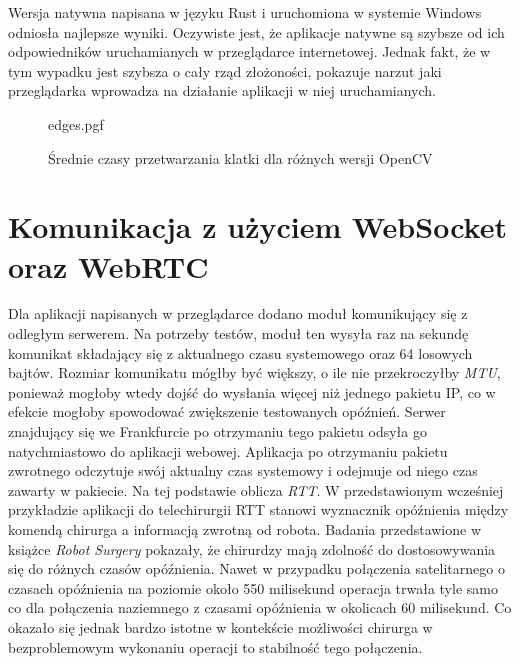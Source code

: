 \documentclass[language=polish,type=master]{aghmodern}
\begin{document}
Wersja natywna napisana w języku Rust i uruchomiona w systemie Windows odniosła najlepsze wyniki.
Oczywiste jest, że aplikacje natywne są szybsze od ich odpowiedników uruchamianych w przeglądarce internetowej.
Jednak fakt, że w tym wypadku jest szybsza o cały rząd złożoności, pokazuje narzut jaki przeglądarka wprowadza na działanie aplikacji w niej uruchamianych.

\begin{figure}[H]
    \centering
    {edges.pgf}
    \caption{Średnie czasy przetwarzania klatki dla różnych wersji OpenCV}
    \label{fig:edges}
\end{figure}

\section{Komunikacja z użyciem WebSocket oraz WebRTC}
Dla aplikacji napisanych w przeglądarce dodano moduł komunikujący się z odległym serwerem.
Na potrzeby testów, moduł ten wysyła raz na sekundę komunikat składający się z aktualnego czasu systemowego oraz 64 losowych bajtów.
Rozmiar komunikatu mógłby być większy, o ile nie przekroczyłby \emph{MTU}\footnotemark{}, ponieważ mogłoby wtedy dojść do wysłania więcej niż jednego pakietu IP, co w efekcie mogłoby spowodować zwiększenie testowanych opóźnień.
Serwer znajdujący się we Frankfurcie po otrzymaniu tego pakietu odsyła go natychmiastowo do aplikacji webowej.
Aplikacja po otrzymaniu pakietu zwrotnego odczytuje swój aktualny czas systemowy i odejmuje od niego czas zawarty w pakiecie.
Na tej podstawie oblicza \emph{RTT}\footnotemark{}.
W przedstawionym wcześniej przykładzie aplikacji do telechirurgii RTT stanowi wyznacznik opóźnienia między komendą chirurga a informacją zwrotną od robota.
Badania przedstawione w książce \emph{Robot Surgery} \cite{telesurgery} pokazały, że chirurdzy mają zdolność do dostosowywania się do różnych czasów opóźnienia.
Nawet w przypadku połączenia satelitarnego o czasach opóźnienia na poziomie około 550 milisekund operacja trwała tyle samo co dla połączenia naziemnego z czasami opóźnienia w okolicach 60 milisekund.
Co okazało się jednak bardzo istotne w kontekście możliwości chirurga w bezproblemowym wykonaniu operacji to stabilność tego połączenia.
\end{document}
